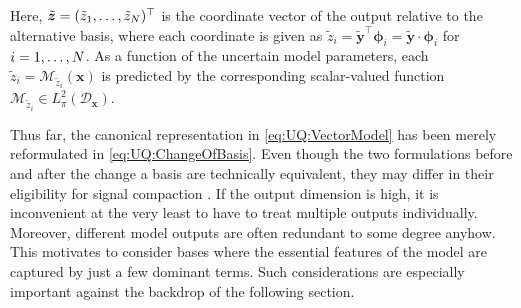 Here, \(\tilde{\bm{z}} = (\tilde{z}_1,\ldots,\tilde{z}_N)^\top\) is the coordinate vector of the output relative to the alternative basis,
where each coordinate is given as \(\tilde{z}_i = \tilde{\bm{y}}^\top \bm{\phi}_i = \tilde{\bm{y}} \cdot \bm{\phi}_i\) for \(i=1,\ldots,N\).
As a function of the uncertain model parameters, each \(\tilde{z}_i = \mathcal{M}_{\tilde{z}_i}(\bm{x})\)
is predicted by the corresponding scalar-valued function \(\mathcal{M}_{\tilde{z}_i} \in L_{\pi}^2(\mathcal{D}_{\bm{x}})\).
\par %
Thus far, the canonical representation in \cref{eq:UQ:VectorModel} has been merely reformulated in \cref{eq:UQ:ChangeOfBasis}.
Even though the two formulations before and after the change a basis are technically equivalent,
they may differ in their eligibility for signal compaction \cite{Statistics:Ahmed1975,Statistics:Wang2012}.
If the output dimension is high, it is inconvenient at the very least to have to treat multiple outputs individually.
Moreover, different model outputs are often redundant to some degree anyhow.
This motivates to consider bases where the essential features of the model are captured by just a few dominant terms.
Such considerations are especially important against the backdrop of the following section.